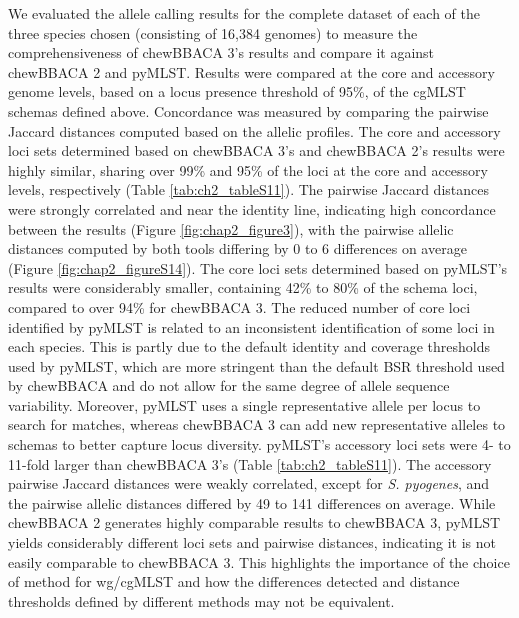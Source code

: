 We evaluated the allele calling results for the complete dataset of each of the three species chosen (consisting of 16,384 genomes) to measure the comprehensiveness of chewBBACA 3's results and compare it against chewBBACA 2 and pyMLST. Results were compared at the core and accessory genome levels, based on a locus presence threshold of 95\%, of the \ac{cgMLST} schemas defined above. Concordance was measured by comparing the pairwise Jaccard distances computed based on the allelic profiles. The core and accessory loci sets determined based on chewBBACA 3’s and chewBBACA 2’s results were highly similar, sharing over 99\% and 95\% of the loci at the core and accessory levels, respectively (Table \ref{tab:ch2_tableS11}). The pairwise Jaccard distances were strongly correlated and near the identity line, indicating high concordance between the results (Figure \ref{fig:chap2_figure3}), with the pairwise allelic distances computed by both tools differing by 0 to 6 differences on average (Figure \ref{fig:chap2_figureS14}). The core loci sets determined based on pyMLST’s results were considerably smaller, containing 42\% to 80\% of the schema loci, compared to over 94\% for chewBBACA 3. The reduced number of core loci identified by pyMLST is related to an inconsistent identification of some loci in each species. This is partly due to the default identity and coverage thresholds used by pyMLST, which are more stringent than the default \ac{BSR} threshold used by chewBBACA and do not allow for the same degree of allele sequence variability. Moreover, pyMLST uses a single representative allele per locus to search for matches, whereas chewBBACA 3 can add new representative alleles to schemas to better capture locus diversity. pyMLST's accessory loci sets were 4- to 11-fold larger than chewBBACA 3's (Table \ref{tab:ch2_tableS11}). The accessory pairwise Jaccard distances were weakly correlated, except for \textit{S. pyogenes}, and the pairwise allelic distances differed by 49 to 141 differences on average. While chewBBACA 2 generates highly comparable results to chewBBACA 3, pyMLST yields considerably different loci sets and pairwise distances, indicating it is not easily comparable to chewBBACA 3. This highlights the importance of the choice of method for \ac{wg/cgMLST} and how the differences detected and distance thresholds defined by different methods may not be equivalent.

